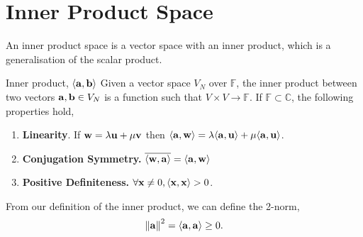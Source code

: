 \documentclass{book}
\def\innerproduct#1#2{{\langle #1},{#2 \rangle}}
\begin{document}
\section{Inner Product Space}
An inner product space is a vector space with an inner product, which is a generalisation of the scalar product.
\begin{Definitions}{Inner product, $\innerproduct{\vb{a}}{\vb{b}}$}{}
	Given a vector space $V_N$ over $\mathbb{F}$, the inner product between two vectors $\vb{a},\vb{b} \in V_N$ is a function such that $V \times V \to \mathbb{F}$. If $\mathbb{F} \subset \mathbb{C}$, the following properties hold,
	\begin{enumerate}
		\item \textbf{Linearity}. If $\vb{w} = \lambda\vb{u} + \mu\vb{v}$ then $\innerproduct{\vb{a}}{\vb{w}} = \lambda\innerproduct{\vb{a}}{\vb{u}} + \mu \innerproduct{\vb{a}}{\vb{u}}$.
		\item \textbf{Conjugation Symmetry.} $\overline{\innerproduct{\vb{w}}{\vb{a}}} = \innerproduct{\vb{a}}{\vb{w}}$
		\item \textbf{Positive Definiteness.} $\forall \vb{x}\neq0, \innerproduct{\vb{x}}{\vb{x}} > 0$.
	\end{enumerate}
\end{Definitions}
From our definition of the inner product, we can define the 2-norm,
\begin{equation}
	\norm{\vb{a}}^2 = \innerproduct{\vb{a}}{\vb{a}} \geq 0.
\end{equation}
\end{document}
